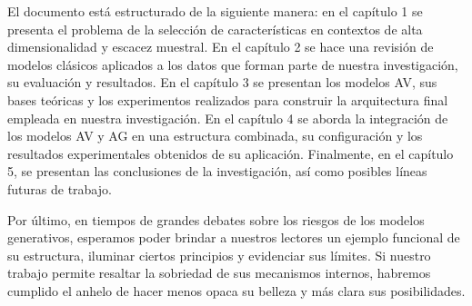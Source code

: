 El documento está estructurado de la siguiente manera: en el capítulo 1 se presenta el problema de la selección de características en contextos de alta dimensionalidad y escacez muestral. En el capítulo 2 se hace una revisión de modelos clásicos aplicados a los datos que forman parte de nuestra investigación, su evaluación y resultados. En el capítulo 3 se presentan los modelos AV, sus bases teóricas y los experimentos realizados para construir la arquitectura final empleada en nuestra investigación. En el capítulo 4 se aborda la integración de los modelos AV y AG en una estructura combinada, su configuración y los resultados experimentales obtenidos de su aplicación. Finalmente, en el capítulo 5, se presentan las conclusiones de la investigación, así como posibles líneas futuras de trabajo.

Por último, en tiempos de grandes debates sobre los riesgos de los modelos generativos, esperamos poder brindar a nuestros lectores un ejemplo funcional de su estructura, iluminar ciertos principios y evidenciar sus límites. Si nuestro trabajo permite resaltar la sobriedad de sus mecanismos internos, habremos cumplido el anhelo de hacer menos opaca su belleza y más clara sus posibilidades.
